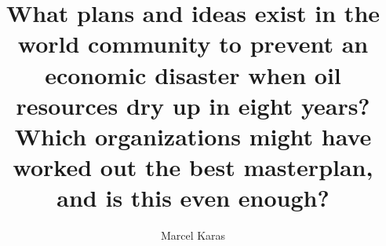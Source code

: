 

\thispagestyle{otherpage} %
\title{What plans and ideas exist in the world community to prevent an economic disaster when oil resources dry up in eight years? Which organizations might have worked out the best masterplan, and is this even enough?}
\author{Marcel Karas}
\note{\today}

\maketitle
\newpage
\tableofcontents
\newpage
\vfill

\vfill

\vfill

\vfill
\newpage
\printbibliography



